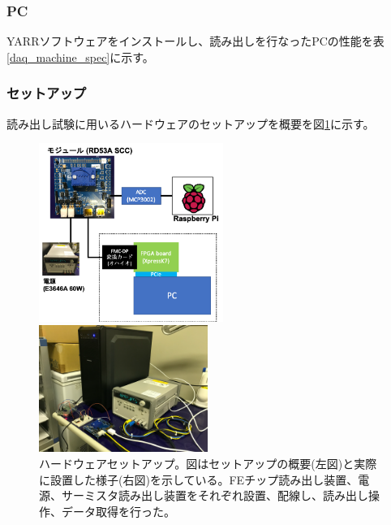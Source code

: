 \subsubsection{PC}
YARRソフトウェアをインストールし、読み出しを行なったPCの性能を表\ref{daq_machine_spec}に示す。
\begin{table}[tbp]
\begin{center}
\caption[読み出しに使用したPCの性能]{読み出しに使用したPCの性能。研究室で所有するPCを使用した。OSはcentOS7である。}
\label{daq_machine_spec}
\end{center}
\end{table}

\subsubsection{セットアップ}
読み出し試験に用いるハードウェアのセットアップを概要を図\ref{readout_setup_overview}に示す。

\begin{figure}[bpt]\centering
  \begin{minipage}{0.5\hsize}
    \includegraphics[width=6cm]{./HW_setup.png}
  \end{minipage}
  \begin{minipage}{0.4\hsize}
    \includegraphics[width=5.5cm]{./HW_setup_pic.png}
  \end{minipage}
\caption[ハードウェアセットアップ]{ハードウェアセットアップ。図はセットアップの概要(左図)と実際に設置した様子(右図)を示している。FEチップ読み出し装置、電源、サーミスタ読み出し装置をそれぞれ設置、配線し、読み出し操作、データ取得を行った。}
\label{readout_setup_overview}
\end{figure}


